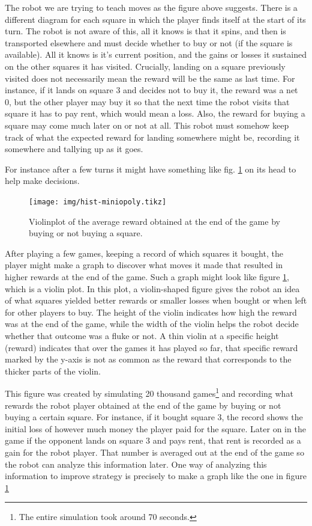 The robot we are trying to teach moves as the figure above 
suggests. There is a different diagram for each square in which 
the player finds itself at the start of its turn. The robot is 
not aware of this, all it knows is that it spins, and then is 
transported elsewhere and must decide whether to buy or not (if 
the square is available). All it knows is it's current 
position, and the gains or losses it sustained on the other 
squares it has visited. Crucially, landing on a square 
previously visited does not necessarily mean the reward will be 
the same as last time. For instance, if it lands on square 3 
and decides not to buy it, the reward was a net 0, but the 
other player may buy it so that the next time the robot visits 
that square it has to pay rent, which would mean a loss. Also, 
the reward for buying a square may come much later on or not at 
all. This robot must somehow keep track of what the expected 
reward for landing somewhere might be, recording it somewhere 
and tallying up as it goes.

For instance after a few turns it might have something like 
fig. \ref{fig:violinplot} on its head to help make decisions.

\begin{figure}
\centering
\texttt{[image: img/hist-miniopoly.tikz]}
\caption{Violinplot of the average reward obtained at the end 
of the game by buying or not buying a square.}
\label{fig:violinplot}
\end{figure}

After playing a few games, keeping a record of which squares it 
bought, the player might make a graph to discover what moves it 
made that resulted in higher rewards at the end of the game. 
Such a graph might look like figure \ref{fig:violinplot}, 
which is a violin plot. In this plot, a violin-shaped figure 
gives the robot an idea of what squares yielded better rewards 
or smaller losses when bought or when left for other players to 
buy. The height of the violin indicates how high the reward was 
at the end of the game, while the width of the violin helps the 
robot decide whether that outcome was a fluke or not. A thin 
violin at a specific height (reward) indicates that over the 
games it has played so far, that specific reward marked by the 
y-axis is not as common as the reward that corresponds to the 
thicker parts of the violin.

This figure was created by simulating 20 thousand 
games\footnote{The entire simulation took around 70 seconds.} 
and recording what rewards the robot player obtained at the end 
of the game by buying or not buying a certain square. For 
instance, if it bought square 3, the record shows the initial 
loss of however much money the player paid for the square. 
Later on in the game if the opponent lands on square 3 and pays 
rent, that rent is recorded as a gain for the robot player. 
That number is averaged out at the end of the game so the robot 
can analyze this information later. One way of analyzing this 
information to improve strategy is precisely to make a graph 
like the one in figure \ref{fig:violinplot}

